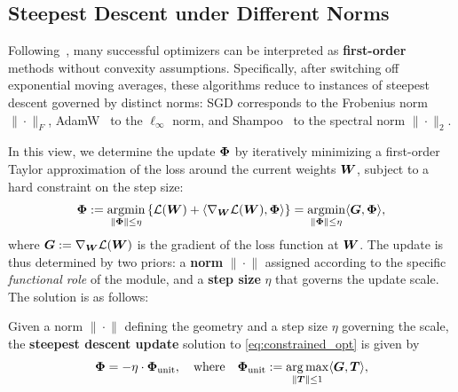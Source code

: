 \subsection{Steepest Descent under Different Norms}
\label{sec:bg_mdl}

Following~\citet{bernstein2024oldoptimizernewnorm, cesista2025sdcbs}, many successful optimizers can be interpreted as \textbf{first-order} methods without convexity assumptions. Specifically, after switching off exponential moving averages, these algorithms reduce to instances of steepest descent governed by distinct norms:  SGD corresponds to the Frobenius norm $\|\!\cdot\!\|_F$, AdamW~\citep{loshchilov2019decoupled} to the $\ell_{\infty}$ norm, and Shampoo~\citep{gupta2018shampoo} to the spectral norm $\|\!\cdot\!\|_2$.

In this view, we determine the update ${\bm{\Phi}}$ by iteratively minimizing a first-order Taylor approximation of the loss around the current weights ${\bm{W}}$, subject to a hard constraint on the step size:
\begin{equation}
    {\bm{\Phi}} := \underset{\|{\bm{\Phi}}\| \le \eta}{\operatorname*{argmin}} \left\{ \mathcal{L}({\bm{W}}) + \left\langle \nabla_{\bm{W}}\mathcal{L}({\bm{W}}), {\bm{\Phi}} \right\rangle \right\} = \underset{\|{\bm{\Phi}}\| \le \eta}{\operatorname*{argmin}} \langle {\bm{G}}, {\bm{\Phi}} \rangle,
    \label{eq:constrained_opt}
\end{equation}
where ${\bm{G}}:=\nabla_{\bm{W}}\mathcal{L}({\bm{W}})$ is the gradient of the loss function at ${\bm{W}}$. The update is thus determined by two priors: a \textbf{norm} $\|\!\cdot\!\|$ assigned according to the specific \emph{functional role} of the module, and a \textbf{step size} $\eta$ that governs the update scale. The solution is as follows:

\begin{mdframed}[style=MyBoxStyle1, frametitle={Definition 1: Steepest Descent Update}, nobreak=true]

Given a norm $\|\!\cdot\!\|$ defining the geometry and a step size $\eta$ governing the scale, the \textbf{steepest descent update} solution to \cref{eq:constrained_opt} is given by
\begin{equation}
    {\bm{\Phi}} = -\eta \cdot {\bm{\Phi}}_{\text{unit}},
\quad
\text{where}
\quad
{\bm{\Phi}}_{\text{unit}} := \underset{\|{\bm{T}}\| \leq 1}{\arg\max} \langle {\bm{G}}, {\bm{T}} \rangle,
\end{equation}
\end{mdframed}



